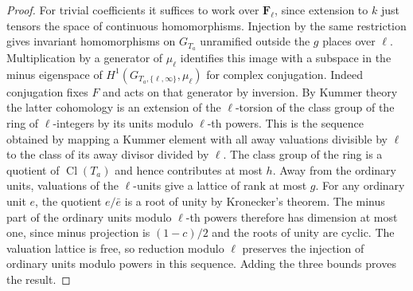\documentclass[a4paper,11pt]{article}
\theoremstyle{definition}
\theoremstyle{remark}
\numberwithin{equation}{section}
\newcommand{\Cl}{\operatorname{Cl}}
\begin{document}
\begin{proof}
For trivial coefficients it suffices to work over
\(\mathbf F_\ell\), since extension to \(k\) just tensors the
space of continuous homomorphisms. Injection by the same
restriction gives invariant homomorphisms on \(G_{T_a}\)
unramified outside the \(g\) places over \(\ell\). Multiplication
by a generator of \(\mu_\ell\) identifies this image with a
subspace in the minus eigenspace of
\(H^1(G_{T_a,\{\ell,\infty\}},\mu_\ell)\) for complex
conjugation. Indeed conjugation fixes \(F\) and acts on that
generator by inversion. By Kummer theory the latter cohomology
is an extension of the \(\ell\)-torsion of the class group of
the ring of \(\ell\)-integers by its units modulo \(\ell\)-th
powers. This is the sequence obtained by mapping a Kummer
element with all away valuations divisible by \(\ell\) to
the class of its away divisor divided by \(\ell\).
The class group of the ring is a quotient of \(\Cl(T_a)\)
and hence contributes at most \(h\). Away from the ordinary
units, valuations of the \(\ell\)-units give a lattice of
rank at most \(g\). For any ordinary unit \(e\), the quotient
\(e/\bar e\) is a root of unity by Kronecker's theorem.
The minus part of the ordinary units modulo \(\ell\)-th
powers therefore has dimension at most one, since minus
projection is \((1-c)/2\) and the roots of unity are cyclic.
The valuation lattice is free, so reduction modulo \(\ell\)
preserves the injection of ordinary units modulo powers in
this sequence. Adding the three bounds proves the result.
\end{proof}
\end{document}
